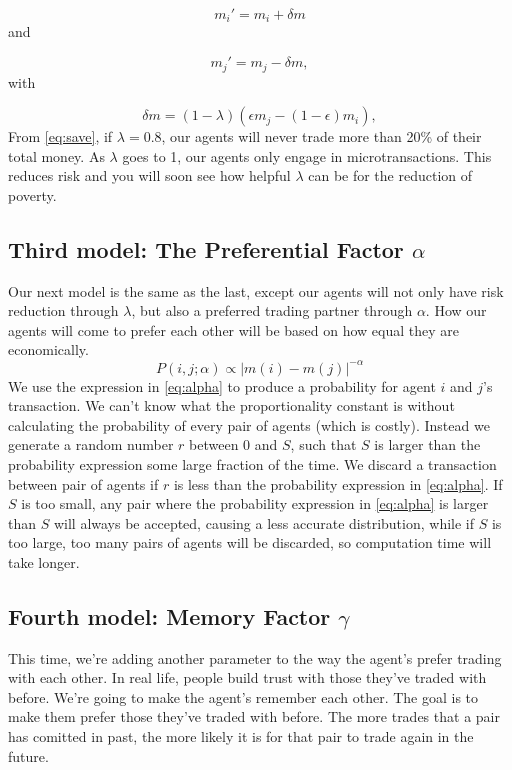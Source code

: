 \documentclass[12pt,a4paper]{article}
\begin{document}
\begin{equation}
  m_i'=m_i+\delta m
\end{equation}
and

\begin{equation}
  m_j'=m_j-\delta m,
\end{equation}
with

\begin{equation}\label{eq:save}
  \delta m=(1-\lambda)(\epsilon m_j-(1-\epsilon)m_i),
\end{equation}
From \eqref{eq:save}, if $\lambda = 0.8$, our agents will never trade more than 20\% of their total money.
As $\lambda$ goes to 1, our agents only engage in microtransactions. This reduces risk and you will soon see how helpful $\lambda$ can be for the reduction of poverty.

\subsection{Third model: The Preferential Factor $\alpha$} \label{sec:model3}
Our next model is the same as the last, except our agents will not only have risk reduction through $\lambda$, but also a preferred trading partner through $\alpha$.
How our agents will come to prefer each other will be based on how equal they are economically.
\begin{equation}\label{eq:alpha}
 P(i,j;\alpha) \propto \left|m(i)-m(j) \right|^{-\alpha}
\end{equation}
We use the expression in \eqref{eq:alpha} to produce a probability for agent $i$ and $j$'s transaction. We can't know what the proportionality constant is without
calculating the probability of every pair of agents (which is costly). Instead we generate a random number $r$ between $0$ and $S$, such that $S$ is larger than the probability expression
some large fraction of the time. We discard a transaction between pair of agents if $r$ is less than the probability expression in \eqref{eq:alpha}.
If $S$ is too small, any pair where the probability expression in \eqref{eq:alpha} is larger than $S$ will always be accepted, causing a less accurate distribution, while if $S$ is too large, too
many pairs of agents will be discarded, so computation time will take longer.

\subsection{Fourth model: Memory Factor $\gamma$} \label{sec:model4}
This time, we're adding another parameter to the way the agent's prefer trading with each other.
In real life, people build trust with those they've traded with before. We're going to make the agent's remember each other. The goal is to make them prefer those they've traded with before.
The more trades that a pair has comitted in past, the more likely it is for that pair to trade again in the future.
\end{document}
